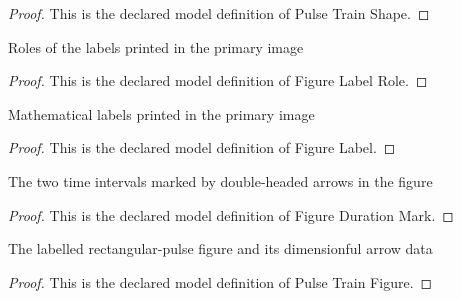 \begin{proof}
  This is the declared model definition of Pulse Train Shape.
\end{proof}
\begin{definition}
  \label{def:physics:phyx-mini-0649:phyxminiproblems-problemphyxmini0649-figurelabelrole}
  Roles of the labels printed in the primary image
\end{definition}
\begin{proof}
  This is the declared model definition of Figure Label Role.
\end{proof}
\begin{definition}
  \label{def:physics:phyx-mini-0649:phyxminiproblems-problemphyxmini0649-figurelabel}
  Mathematical labels printed in the primary image
\end{definition}
\begin{proof}
  This is the declared model definition of Figure Label.
\end{proof}
\begin{definition}
  \label{def:physics:phyx-mini-0649:phyxminiproblems-problemphyxmini0649-figuredurationmark}
  The two time intervals marked by double-headed arrows in the figure
\end{definition}
\begin{proof}
  This is the declared model definition of Figure Duration Mark.
\end{proof}
\begin{definition}
  \label{def:physics:phyx-mini-0649:phyxminiproblems-problemphyxmini0649-pulsetrainfigure}
  The labelled rectangular-pulse figure and its dimensionful arrow data
\end{definition}
\begin{proof}
  This is the declared model definition of Pulse Train Figure.
\end{proof}
